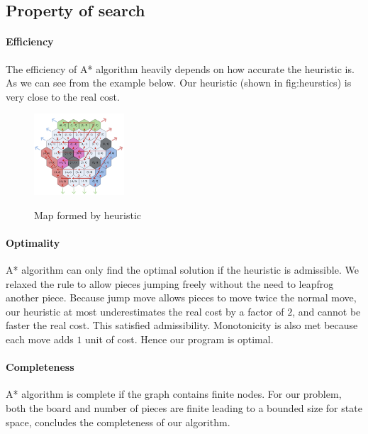 \documentclass[10.5pt,a4paper]{article}
\begin{document}
    \subsection{Property of search}
        \paragraph{Efficiency} The efficiency of A* algorithm heavily depends on how accurate the heuristic is. As we can see from the example below. Our heuristic (shown in \refname{fig:heurstics}) is very close to the real cost.
        \begin{figure}
            \vspace{-32pt}
                \begin{center}
                    \includegraphics[width=0.3\textwidth]{heuristic.png}
                    \label{fig:heurstics}
                \end{center}
            \vspace{-10pt}
            \caption{Map formed by heuristic}
            \vspace{-100pt}
        \end{figure}
        \vspace{-40pt}
        \paragraph{Optimality} A* algorithm can only find the optimal solution if the heuristic is admissible. We relaxed the rule to allow pieces jumping freely without the need to leapfrog another piece. Because jump move allows pieces to move twice the normal move, our heuristic at most underestimates the real cost by a factor of $2$, and cannot be faster the real cost. This satisfied admissibility. Monotonicity is also met because each move adds $1$ unit of cost. Hence our program is optimal.
        \vspace{-10pt}
        \paragraph{Completeness} A* algorithm is complete if the graph contains finite nodes. For our problem, both the board and number of pieces are finite leading to a bounded size for state space, concludes the completeness of our algorithm.
\end{document}
